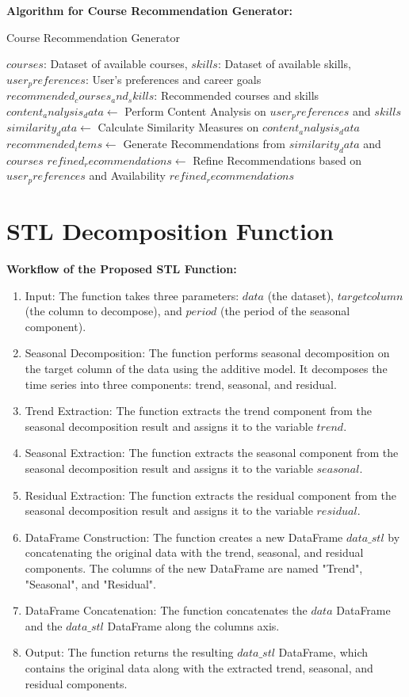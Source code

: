 \textbf{Algorithm for Course Recommendation Generator:}

\begin{algorithm}
\caption{Course Recommendation Generator}
\begin{algorithmic}[1]
\Require $courses$: Dataset of available courses, $skills$: Dataset of available skills, $user_preferences$: User's preferences and career goals
\Ensure $recommended_courses_and_skills$: Recommended courses and skills
\State $content_analysis_data \gets$ Perform Content Analysis on $user_preferences$ and $skills$
\State $similarity_data \gets$ Calculate Similarity Measures on $content_analysis_data$
\State $recommended_items \gets$ Generate Recommendations from $similarity_data$ and $courses$
\State $refined_recommendations \gets$ Refine Recommendations based on $user_preferences$ and Availability
\State \Return $refined_recommendations$
\EndFunction
\end{algorithmic}
\end{algorithm}

\section{STL Decomposition Function}
\textbf{Workflow of the Proposed STL Function:}
\begin{enumerate}
    \item Input: The function takes three parameters: $data$ (the dataset), $target column$ (the column to decompose), and $period$ (the period of the seasonal component).
    \item Seasonal Decomposition: The function performs seasonal decomposition on the target column of the data using the additive model. It decomposes the time series into three components: trend, seasonal, and residual.
    \item Trend Extraction: The function extracts the trend component from the seasonal decomposition result and assigns it to the variable $trend$.
    \item Seasonal Extraction: The function extracts the seasonal component from the seasonal decomposition result and assigns it to the variable $seasonal$.
    \item Residual Extraction: The function extracts the residual component from the seasonal decomposition result and assigns it to the variable $residual$.
    \item DataFrame Construction: The function creates a new DataFrame $data\_stl$ by concatenating the original data with the trend, seasonal, and residual components. The columns of the new DataFrame are named "Trend", "Seasonal", and "Residual".
    \item DataFrame Concatenation: The function concatenates the $data$ DataFrame and the $data\_stl$ DataFrame along the columns axis.
    \item Output: The function returns the resulting $data\_stl$ DataFrame, which contains the original data along with the extracted trend, seasonal, and residual components.
\end{enumerate}

